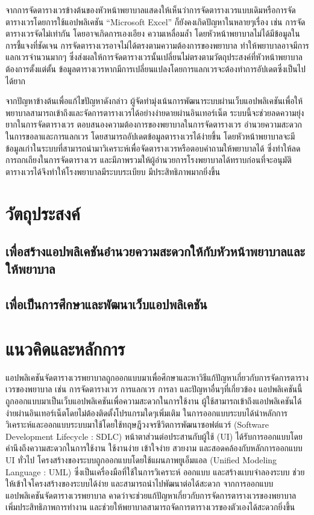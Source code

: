จากการจัดตารางเวรข้างต้นของหัวหน้าพยาบาลแสดงให้เห็นว่าการจัดตารางเวรแบบเดิมหรือการจัดตารางเวรโดยการใช้แอปพลิเคชัน “Microsoft Excel” ก็ยังคงเกิดปัญหาในหลายๆเรื่อง เช่น การจัดตารางเวรจัดไม่เท่ากัน โดยอาจเกิดการเองเอียง ความเหลื่อมล้ำ โดยหัวหน้าพยาบาลไม่ได้มีข้อมูลในการชี้แจงที่ชัดเจน การจัดตารางเวรอาจไม่ได้ตรงตามความต้องการของพยาบาล ทำให้พยาบาลอาจมีการแลกเวรจำนวนมากๆ ซึ่งส่งผลให้การจัดตารางเวรนั้นเปลี่ยนไม่ตรงตามวัตถุประสงค์ที่หัวหน้าพยาบาลต้องการตั้งแต่ตั้น ข้อมูลตารางเวรหากมีการเปลี่ยนแปลงโดยการแลกเวรจะต้องทำการอัปเดตซึ่งเป็นไปได้ยาก 

จากปัญหาข้างต้นเพื่อแก้ไขปัญหาดังกล่าว ผู้จัดทำมุ่งเน้นการพัฒนาระบบผ่านเว็บแอปพลิเคชันเพื่อให้พยาบาลสามารถเข้าถึงและจัดการตารางเวรได้อย่างง่ายดายผ่านอินเทอร์เน็ต ระบบนี้จะช่วยลดความยุ่งยากในการจัดตารางเวร ตอบสนองความต้องการของพยาบาลในการจัดตารางเวร อำนวยความสะดวกในการขอลาและการแลกเวร โดยสามารถอัปเดตข้อมูลตารางเวรได้ง่ายขึ้น โดยหัวหน้าพยาบาลจะมีข้อมูลเก่าในระบบที่สามารถนำมาวิเคราะห์เพื่อจัดตารางเวรหรือตอบคำถามให้พยาบาลได้ ซึ่งทำให้ลดการถกเถียงในการจัดตารางเวร และมีภาพรวมให้ผู้อำนวยการโรงพยาบาลได้ทราบก่อนที่จะอนุมัติตารางเวรได้จึงทำให้โรงพยาบาลมีระบบระเบียบ มีประสิทธิภาพมากยิ่งขึ้น

\section{{วัตถุประสงค์}}

\hspace{0cm}\subsection{เพื่อสร้างแอปพลิเคชันอำนวยความสะดวกให้กับหัวหน้าพยาบาลและให้พยาบาล}

\hspace{0cm}\subsection{เพื่อเป็นการศึกษาและพัฒนาเว็บแอปพลิเคชัน}

\section{แนวคิดและหลักการ}

แอปพลิเคชันจัดตารางเวรพยาบาลถูกออกแบบมาเพื่อศึกษาและหาวิธีแก้ปัญหาเกี่ยวกับการจัดการตารางเวรของพยาบาล เช่น การจัดตารางเวร การแลกเวร การลา และปัญหาอื่นๆที่เกี่ยวข้อง แอปพลิเคชันนี้ถูกออกแบบมาเป็นเว็บแอปพลิเคชันเพื่อความสะดวกในการใช้งาน ผู้ใช้สามารถเข้าถึงแอปพลิเคชันได้ง่ายผ่านอินเทอร์เน็ตโดยไม่ต้องติดตั้งโปรแกรมใดๆเพิ่มเติม ในการออกแบบระบบได้นำหลักการวิเคราะห์และออกแบบระบบมาใช้โดยใช้ทฤษฎีวงจรชีวิตการพัฒนาซอฟต์แวร์ (Software Development Lifecycle : SDLC)
หน้าตาส่วนต่อประสานกับผู้ใช้ (UI) ได้รับการออกแบบโดยคำนึงถึงความสะดวกในการใช้งาน ใช้งานง่าย เข้าใจง่าย สวยงาม และสอดคล้องกับหลักการออกแบบ UI ทั่วไป โครงสร้างของระบบถูกออกแบบโดยใช้แผนภาพยูเอ็มแอล (Unified Modeling Language : UML) ซึ่งเป็นเครื่องมือที่ใช้ในการวิเคราะห์ ออกแบบ และสร้างแบบจำลองระบบ ช่วยให้เข้าใจโครงสร้างของระบบได้ง่าย และสามารถนำไปพัฒนาต่อได้สะดวก จากการออกแบบแอปพลิเคชันจัดตารางเวรพยาบาล คาดว่าจะช่วยแก้ปัญหาเกี่ยวกับการจัดการตารางเวรของพยาบาล เพิ่มประสิทธิภาพการทำงาน และช่วยให้พยาบาลสามารถจัดการตารางเวรของตัวเองได้สะดวกยิ่งขึ้น
\clearpage

